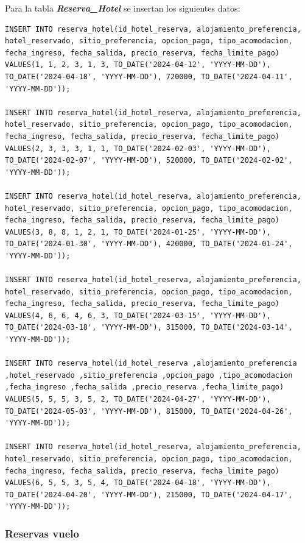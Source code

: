 \documentclass{article}
\begin{document}
Para la tabla \textit{\textbf{Reserva\_Hotel}} se insertan los siguientes datos:

\begin{lstlisting}
INSERT INTO reserva_hotel(id_hotel_reserva, alojamiento_preferencia, hotel_reservado, sitio_preferencia, opcion_pago, tipo_acomodacion, fecha_ingreso, fecha_salida, precio_reserva, fecha_limite_pago)
VALUES(1, 1, 2, 3, 1, 3, TO_DATE('2024-04-12', 'YYYY-MM-DD'), TO_DATE('2024-04-18', 'YYYY-MM-DD'), 720000, TO_DATE('2024-04-11', 'YYYY-MM-DD'));

INSERT INTO reserva_hotel(id_hotel_reserva, alojamiento_preferencia, hotel_reservado, sitio_preferencia, opcion_pago, tipo_acomodacion, fecha_ingreso, fecha_salida, precio_reserva, fecha_limite_pago)
VALUES(2, 3, 3, 3, 1, 1, TO_DATE('2024-02-03', 'YYYY-MM-DD'), TO_DATE('2024-02-07', 'YYYY-MM-DD'), 520000, TO_DATE('2024-02-02', 'YYYY-MM-DD'));

INSERT INTO reserva_hotel(id_hotel_reserva, alojamiento_preferencia, hotel_reservado, sitio_preferencia, opcion_pago, tipo_acomodacion, fecha_ingreso, fecha_salida, precio_reserva, fecha_limite_pago)
VALUES(3, 8, 8, 1, 2, 1, TO_DATE('2024-01-25', 'YYYY-MM-DD'), TO_DATE('2024-01-30', 'YYYY-MM-DD'), 420000, TO_DATE('2024-01-24', 'YYYY-MM-DD'));

INSERT INTO reserva_hotel(id_hotel_reserva, alojamiento_preferencia, hotel_reservado, sitio_preferencia, opcion_pago, tipo_acomodacion, fecha_ingreso, fecha_salida, precio_reserva, fecha_limite_pago)
VALUES(4, 6, 6, 4, 6, 3, TO_DATE('2024-03-15', 'YYYY-MM-DD'), TO_DATE('2024-03-18', 'YYYY-MM-DD'), 315000, TO_DATE('2024-03-14', 'YYYY-MM-DD'));

INSERT INTO reserva_hotel(id_hotel_reserva ,alojamiento_preferencia ,hotel_reservado ,sitio_preferencia ,opcion_pago ,tipo_acomodacion ,fecha_ingreso ,fecha_salida ,precio_reserva ,fecha_limite_pago)
VALUES(5, 5, 5, 3, 5, 2, TO_DATE('2024-04-27', 'YYYY-MM-DD'), TO_DATE('2024-05-03', 'YYYY-MM-DD'), 815000, TO_DATE('2024-04-26', 'YYYY-MM-DD'));

INSERT INTO reserva_hotel(id_hotel_reserva, alojamiento_preferencia, hotel_reservado, sitio_preferencia, opcion_pago, tipo_acomodacion, fecha_ingreso, fecha_salida, precio_reserva, fecha_limite_pago)
VALUES(6, 5, 5, 3, 5, 4, TO_DATE('2024-04-18', 'YYYY-MM-DD'), TO_DATE('2024-04-20', 'YYYY-MM-DD'), 215000, TO_DATE('2024-04-17', 'YYYY-MM-DD'));
\end{lstlisting}

\subsubsection{Reservas vuelo}
\end{document}
